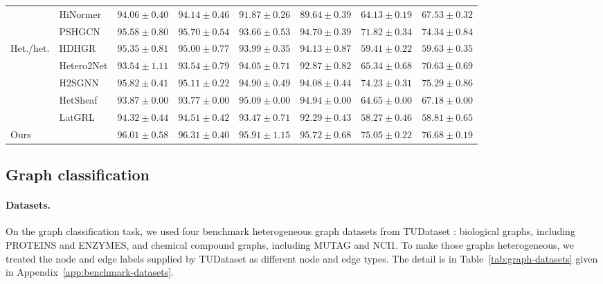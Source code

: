 \begin{table}[t]
{\begin{tabular}{llcccccc}
    & HiNormer
    & $94.06 \pm 0.40$
    & $94.14 \pm 0.46$
    & $91.87 \pm 0.26$
    & $89.64 \pm 0.39$
    & $64.13 \pm 0.19$
    & $67.53 \pm 0.32$ \\

    & PSHGCN
    & $95.58 \pm 0.80$
    & $95.70 \pm 0.54$
    & $93.66 \pm 0.53$
    & $94.70 \pm 0.39$
    & $71.82 \pm 0.34$
    & $74.34 \pm 0.84$ \\
    \midrule

    \multirow{5}{*}{Het./het.}
    & HDHGR
    & $95.35 \pm 0.81$
    & $95.00 \pm 0.77$
    & $93.99 \pm 0.35$
    & $94.13 \pm 0.87$
    & $59.41 \pm 0.22$
    & $59.63 \pm 0.35$ \\

    & Hetero2Net
    & $93.54 \pm 1.11$
    & $93.54 \pm 0.79$
    & $94.05 \pm 0.71$
    & $92.87 \pm 0.82$
    & $65.34 \pm 0.68$
    & $70.63 \pm 0.69$ \\

    & H2SGNN
    & $95.82 \pm 0.41$
    & $95.11 \pm 0.22$
    & $94.90 \pm 0.49$
    & $94.08 \pm 0.44$
    & $74.23 \pm 0.31$
    & $75.29 \pm 0.86$ \\

    & HetSheaf
    & $93.87 \pm 0.00$
    & $93.77 \pm 0.00$
    & $95.09 \pm 0.00$
    & $94.94 \pm 0.00$
    & $64.65 \pm 0.00$
    & $67.18 \pm 0.00$ \\

    & LatGRL
    & $94.32 \pm 0.44$
    & $94.51 \pm 0.42$
    & $93.47 \pm 0.71$
    & $92.29 \pm 0.43$
    & $58.27 \pm 0.46$
    & $58.81 \pm 0.65$ \\
    \midrule

    Ours
    & \textbf{\method{}}
    & $\mathbf{96.01 \pm 0.58}$
    & $\mathbf{96.31 \pm 0.40}$
    & $\mathbf{95.91 \pm 1.15}$
    & $\mathbf{95.72 \pm 0.68}$
    & $\mathbf{75.05 \pm 0.22}$
    & $\mathbf{76.68 \pm 0.19}$ \\
    \bottomrule
  \end{tabular}%
  }
\end{table}



\subsection{Graph classification}
\label{sec:setup-graph}
\paragraph{Datasets.}
On the graph classification task, we used four benchmark heterogeneous graph datasets from TUDataset \cite{morris2020tudataset}: biological graphs, including PROTEINS and ENZYMES, and chemical compound graphs, including MUTAG and NCI1. To make those graphs heterogeneous, we treated the node and edge labels supplied by TUDataset as different node and edge types. The detail is  in Table~\ref{tab:graph-datasets} given in Appendix~\ref{app:benchmark-datasets}.



